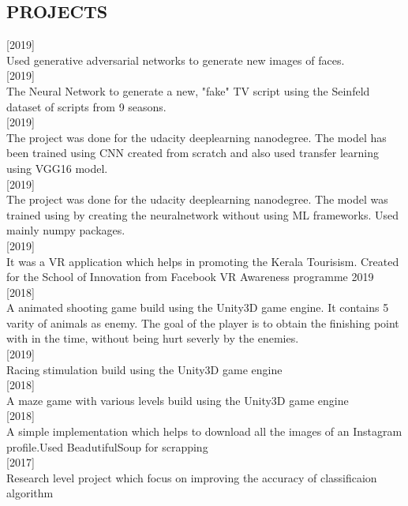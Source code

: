 \documentclass[margin]{res}
\begin{document}
\begin{resume}
\section{PROJECTS} 

    \sl

    \normalfont {} \hfill [2019] \\ 
     Used generative adversarial networks to generate new images of faces.
\\
    \normalfont {} \hfill [2019] \\ 
     The Neural Network to generate a new, "fake" TV script using the Seinfeld dataset of scripts from 9 seasons.
\\
    \normalfont {} \hfill [2019] \\ 
     The project was done for the udacity deeplearning nanodegree. The model has been trained using CNN created from scratch and also used transfer learning using VGG16 model. 
\\
    \normalfont {} \hfill [2019] \\ 
     The project was done for the udacity deeplearning nanodegree. The model was trained using by creating the neuralnetwork without using ML frameworks. Used mainly numpy packages.
     \\   
    \normalfont {} \hfill [2019]\\ 
     It was a VR application which helps in promoting the Kerala Tourisism. Created for the  School of Innovation from Facebook VR Awareness programme 2019 
     \\     \normalfont {} \hfill [2018] \\ 
     A animated shooting game build using the Unity3D game engine. It contains 5 varity of animals as enemy. The goal of the player is to obtain the finishing point with in the time, without being hurt severly by the enemies.
     \\     \normalfont {} \hfill [2019] \\ 
     Racing stimulation build using the Unity3D game engine
     \\     \normalfont {} \hfill [2018] \\ 
     A maze game with various levels build using the Unity3D game engine
     \\    \normalfont {} \hfill [2018]\\
     A simple implementation which helps to download all the images of an Instagram profile.Used BeadutifulSoup for scrapping\\
    \normalfont {} \hfill [2017] \\ Research level project which focus on improving the accuracy of classificaion algorithm


\end{resume}
\end{document}
